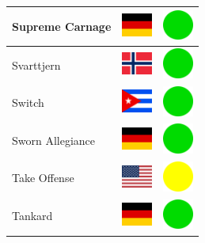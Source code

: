 \documentclass[12pt, a4paper, twoside]{report}
\begin{document}
\begin{center}
\begin{longtable}{|p{5cm}|p{2cm}|p{2cm}|}
 Supreme Carnage                                            & \includegraphics[width=1cm]{../img/flags/de} &   \includegraphics[width=1cm]{../likes/y} \\ \hline
 Svarttjern                                                 & \includegraphics[width=1cm]{../img/flags/no} &   \includegraphics[width=1cm]{../likes/y} \\ \hline
 Switch                                                     & \includegraphics[width=1cm]{../img/flags/cu} &   \includegraphics[width=1cm]{../likes/y} \\ \hline
 Sworn Allegiance                                           & \includegraphics[width=1cm]{../img/flags/de} &   \includegraphics[width=1cm]{../likes/y} \\ \hline
 Take Offense                                               & \includegraphics[width=1cm]{../img/flags/us} &   \includegraphics[width=1cm]{../likes/m} \\ \hline
 Tankard                                                    & \includegraphics[width=1cm]{../img/flags/de} &   \includegraphics[width=1cm]{../likes/y} \\ \hline

\end{longtable}
\end{center}
\end{document}
